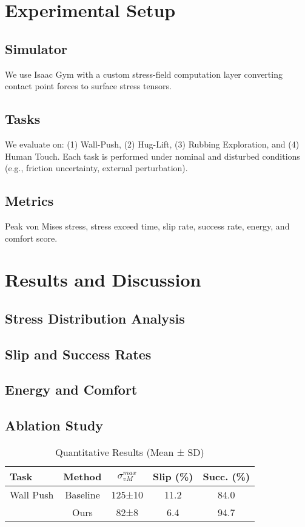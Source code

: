 \documentclass[conference]{IEEEtran}
\begin{document}
\section{Experimental Setup}
\subsection{Simulator}
We use Isaac Gym with a custom stress-field computation layer converting contact point forces to surface stress tensors.
\subsection{Tasks}
We evaluate on:
(1) Wall-Push, (2) Hug-Lift, (3) Rubbing Exploration, and (4) Human Touch.
Each task is performed under nominal and disturbed conditions (e.g., friction uncertainty, external perturbation).
\subsection{Metrics}
Peak von Mises stress, stress exceed time, slip rate, success rate, energy, and comfort score.

\section{Results and Discussion}
\subsection{Stress Distribution Analysis}
\subsection{Slip and Success Rates}
\subsection{Energy and Comfort}
\subsection{Ablation Study}

\begin{table}[t]
\centering
\caption{Quantitative Results (Mean ± SD)}
\begin{tabular}{lcccc}
\toprule
Task & Method & $\sigma_{vM}^{max}$ & Slip (\%) & Succ. (\%)\\
\midrule
Wall Push & Baseline & 125±10 & 11.2 & 84.0\\
          & Ours & 82±8 & 6.4 & 94.7\\
\bottomrule
\end{tabular}
\end{table}
\end{document}
